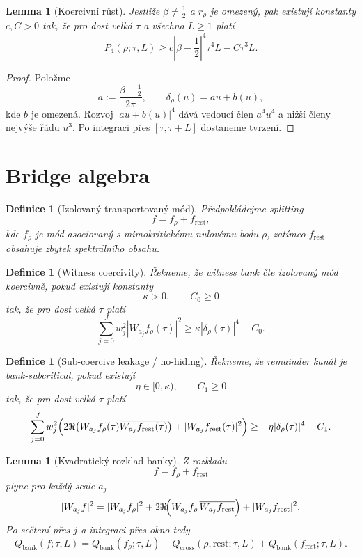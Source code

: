 \documentclass[11pt,a4paper]{article}
\newtheorem{lemma}[theorem]{Lemma}
\newtheorem{definition}[theorem]{Definice}
\begin{document}
\begin{lemma}[Koercivní růst]
Jestliže \(\beta\neq \frac12\) a \(r_\rho\) je omezený, pak existují konstanty \(c,C>0\) tak, že pro
dost velká \(\tau\) a všechna \(L\ge 1\) platí
\[
P_4(\rho;\tau,L)\ge c\left|\beta-\frac12\right|^4\tau^4L-C\tau^3L.
\]
\end{lemma}

\begin{proof}
Položme
\[
a:=\frac{\beta-\tfrac12}{2\pi},\qquad \delta_\rho(u)=au+b(u),
\]
kde \(b\) je omezená. Rozvoj \(|au+b(u)|^4\) dává vedoucí člen \(a^4u^4\) a nižší členy nejvýše
řádu \(u^3\). Po integraci přes \([\tau,\tau+L]\) dostaneme tvrzení.
\end{proof}

\section{Bridge algebra}

\begin{definition}[Izolovaný transportovaný mód]
Předpokládejme splitting
\[
f=f_\rho+f_{\mathrm{rest}},
\]
kde \(f_\rho\) je mód asociovaný s mimokritickému nulovému bodu \(\rho\), zatímco
\(f_{\mathrm{rest}}\) obsahuje zbytek spektrálního obsahu.
\end{definition}

\begin{definition}[Witness coercivity]
Řekneme, že witness bank čte izolovaný mód koercivně, pokud existují konstanty
\[
\kappa>0,\qquad C_0\ge 0
\]
tak, že pro dost velká \(\tau\) platí
\[
\sum_{j=0}^{J} w_j^2 |W_{a_j}f_\rho(\tau)|^2
\ge
\kappa |\delta_\rho(\tau)|^4-C_0.
\]
\end{definition}

\begin{definition}[Sub-coercive leakage / no-hiding]
Řekneme, že remainder kanál je bank-subcritical, pokud existují
\[
\eta\in[0,\kappa),\qquad C_1\ge 0
\]
tak, že pro dost velká \(\tau\) platí
\[
\sum_{j=0}^{J} w_j^2
\Bigl(
2\Re\bigl(W_{a_j}f_\rho(\tau)\overline{W_{a_j}f_{\mathrm{rest}}(\tau)}\bigr)
+
|W_{a_j}f_{\mathrm{rest}}(\tau)|^2
\Bigr)
\ge
-\eta |\delta_\rho(\tau)|^4-C_1.
\]
\end{definition}

\begin{lemma}[Kvadratický rozklad banky]
Z rozkladu
\[
f=f_\rho+f_{\mathrm{rest}}
\]
plyne pro každý scale \(a_j\)
\[
|W_{a_j}f|^2
=
|W_{a_j}f_\rho|^2
+
2\Re\!\Bigl(W_{a_j}f_\rho\,\overline{W_{a_j}f_{\mathrm{rest}}}\Bigr)
+
|W_{a_j}f_{\mathrm{rest}}|^2.
\]
Po sečtení přes \(j\) a integraci přes okno tedy
\[
Q_{\mathrm{bank}}(f;\tau,L)
=
Q_{\mathrm{bank}}(f_\rho;\tau,L)
+
Q_{\mathrm{cross}}(\rho,\mathrm{rest};\tau,L)
+
Q_{\mathrm{bank}}(f_{\mathrm{rest}};\tau,L).
\]
\end{lemma}
\end{document}

